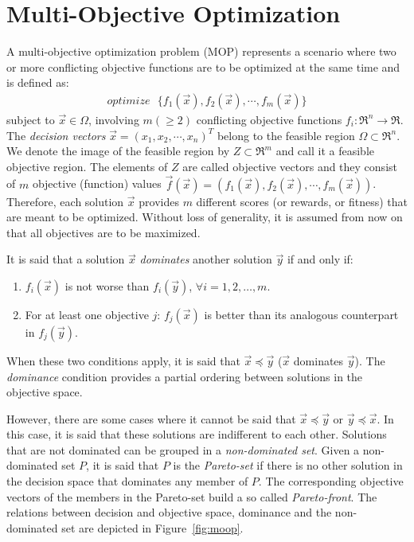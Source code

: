 \documentclass[journal]{IEEEtran}
\begin{document}
\section{Multi-Objective Optimization} \label{sec:moo}

A multi-objective optimization problem (MOP) represents a scenario where two or more conflicting objective functions are to be optimized at the same time and is defined as: 
\begin{eqnarray}
optimize ~~~\{ f_1(\vec x), f_2(\vec x),\cdots , f_m(\vec x) \} 
\end{eqnarray}
subject to $\vec x \in \Omega$, involving $m (\geq 2)$ conflicting objective functions $f_i : \Re ^n \rightarrow \Re$. The \textit{decision vectors} 
$\vec x = (x_1, x_2, \cdots, x_n)^T$ belong to the feasible region $\Omega \subset \Re ^n$. We denote the image of the feasible region by $Z\subset \Re ^m$ and call it a feasible objective region. The
elements of $Z$ are called objective vectors and they consist of $m$ objective (function) values $\vec f(\vec x)= (f_1(\vec x), f_2(\vec x), \cdots, f_m(\vec x))$.
Therefore, each solution $\vec x$ provides $m$ different scores (or rewards, or fitness) that are meant to be optimized. Without loss of generality, it is assumed from now on that all objectives are to be maximized.

It is said that a solution $\vec x$ \textit{dominates} another solution $\vec y$ if and only if:
\begin{enumerate}
\item $f_i(\vec x)$ is not worse than $f_i(\vec y)$, $\forall i = 1, 2, \dots, m$.
\item For at least one objective $j$: $f_j(\vec x)$ is better than its analogous counterpart in $f_j(\vec y)$.
\end{enumerate}

When these two conditions apply, it is said that $\vec x \preceq \vec y$ ($\vec x$ dominates $\vec y$). The \textit{dominance} condition provides a partial ordering between solutions in the objective space.

However, there are some cases where it cannot be said that $\vec x \preceq \vec y$ or $\vec y \preceq \vec x$. 
In this case, it is said that these solutions are indifferent to each other. Solutions that are not dominated can be grouped in a \textit{non-dominated set}. Given a non-dominated set $P$, it is said that $P$ is the \textit{Pareto-set} if there is no other solution in the decision space that dominates any member of $P$. The corresponding objective vectors of the members in the Pareto-set build a so called \textit{Pareto-front}. The relations between decision and objective space, dominance and the non-dominated set are depicted in Figure~\ref{fig:moop}.
\end{document}

